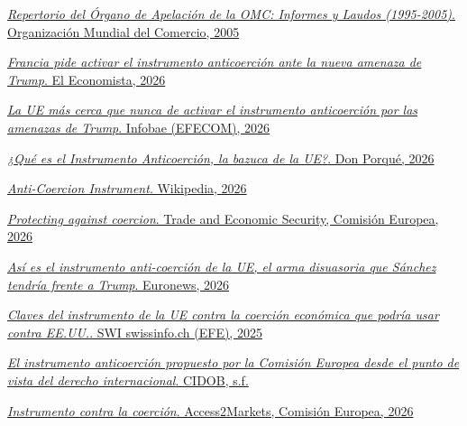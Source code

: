 \documentclass[10pt,a4paper]{article}
\begin{document}
\href{https://www.wto.org/spanish/tratop_s/dispu_s/repertory_s/g3_s.htm}{\textit{Repertorio del Órgano de Apelación de la OMC: Informes y Laudos (1995-2005)}. Organización Mundial del Comercio, 2005}

\href{https://www.eleconomista.es/economia/noticias/13905474/05/26/francia-pide-activar-el-instrumento-anticoercion-ante-la-nueva-amenaza-de-trump-de-aplicar-aranceles-del-20.html}{\textit{Francia pide activar el instrumento anticoerción ante la nueva amenaza de Trump}. El Economista, 2026}

\href{https://www.infobae.com/espana/agencias/2026/01/18/la-ue-mas-cerca-que-nunca-de-activar-el-instrumento-anticoercion-por-las-amenazas-de-trump/}{\textit{La UE más cerca que nunca de activar el instrumento anticoerción por las amenazas de Trump}. Infobae (EFECOM), 2026}

\href{https://donporque.com/que-es-el-instrumento-anticoercion/}{\textit{¿Qué es el Instrumento Anticoerción, la bazuca de la UE?}. Don Porqué, 2026}

\href{https://en.wikipedia.org/wiki/Anti-Coercion_Instrument}{\textit{Anti-Coercion Instrument}. Wikipedia, 2026}

\href{https://policy.trade.ec.europa.eu/enforcement-and-protection/protecting-against-coercion_en}{\textit{Protecting against coercion}. Trade and Economic Security, Comisión Europea, 2026}

\href{https://es.euronews.com/2026/03/06/sanchez-la-ue-se-arman-frente-trump-asi-es-el-articulo-5-mecanismo-secreto-de-la-ue}{\textit{Así es el instrumento anti-coerción de la UE, el arma disuasoria que Sánchez tendría frente a Trump}. Euronews, 2026}

\href{https://www.swissinfo.ch/spa/claves-del-instrumento-de-la-ue-contra-la-coerci%C3%B3n-econ%C3%B3mica-que-podr%C3%ADa-usar-contra-ee.uu./89105365}{\textit{Claves del instrumento de la UE contra la coerción económica que podría usar contra EE.UU.}. SWI swissinfo.ch (EFE), 2025}

\href{https://www.cidob.org/publicaciones/el-instrumento-anticoercion-propuesto-por-la-comision-europea-desde-el-punto-de-vista}{\textit{El instrumento anticoerción propuesto por la Comisión Europea desde el punto de vista del derecho internacional}. CIDOB, s.f.}

\href{https://trade.ec.europa.eu/access-to-markets/es/content/instrumento-contra-la-coercion}{\textit{Instrumento contra la coerción}. Access2Markets, Comisión Europea, 2026}
\end{document}
